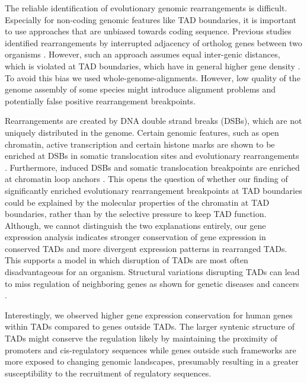 \documentclass[a4paper,twoside=true,openright,parskip=full,chapterprefix=true,11pt,headings=normal,bibliography=totoc,listof=totoc,titlepage=on,captions=tableabove,draft=false]{scrreprt}
\theoremstyle{definition}
\theoremstyle{definition}
\theoremstyle{definition}
\theoremstyle{remark}
\begin{document}
The reliable identification of evolutionary genomic rearrangements is
difficult. Especially for non-coding genomic features like TAD
boundaries, it is important to use approaches that are unbiased towards
coding sequence. Previous studies identified rearrangements by
interrupted adjacency of ortholog genes between two organisms
\citep{VietriRudan2015, Pevzner2003}. However, such an approach assumes
equal inter-genic distances, which is violated at TAD boundaries, which
have in general higher gene density \citep{Dixon2012, Hou2012}. To avoid
this bias we used whole-genome-alignments. However, low quality of the
genome assembly of some species might introduce alignment problems and
potentially false positive rearrangement breakpoints.

Rearrangements are created by DNA double strand breaks (DSBs), which are
not uniquely distributed in the genome. Certain genomic features, such
as open chromatin, active transcription and certain histone marks are
shown to be enriched at DSBs in somatic translocation sites
\citep{Roukos2014} and evolutionary rearrangements
\citep{Murphy2005, Hinsch2006}. Furthermore, induced DSBs and somatic
translocation breakpoints are enriched at chromatin loop anchors
\citep{Canela2017}. This opens the question of whether our finding of
significantly enriched evolutionary rearrangement breakpoints at TAD
boundaries could be explained by the molecular properties of the
chromatin at TAD boundaries, rather than by the selective pressure to
keep TAD function. Although, we cannot distinguish the two explanations
entirely, our gene expression analysis indicates stronger conservation
of gene expression in conserved TADs and more divergent expression
patterns in rearranged TADs. This supports a model in which disruption
of TADs are most often disadvantageous for an organism. Structural
variations disrupting TADs can lead to miss regulation of neighboring
genes as shown for genetic diseases
\citep{Ibn-Salem2014, Lupianez2015, Redin2017, Franke2016} and cancers
\citep{Hnisz2016, Northcott2014, Weischenfeldt2016}.

Interestingly, we observed higher gene expression conservation for human
genes within TADs compared to genes outside TADs. The larger syntenic
structure of TADs might conserve the regulation likely by maintaining
the proximity of promoters and cis-regulatory sequences while genes
outside such frameworks are more exposed to changing genomic landscapes,
presumably resulting in a greater susceptibility to the recruitment of
regulatory sequences.
\end{document}

